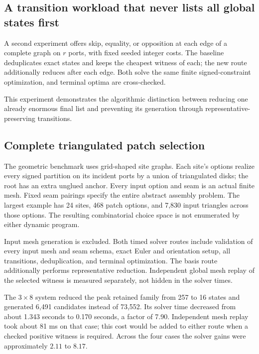 \documentclass[11pt,letterpaper]{article}
\theoremstyle{definition}
\begin{document}
\subsection{A transition workload that never lists all global states first}
A second experiment offers skip, equality, or opposition at each edge of a complete graph on $r$ ports, with fixed seeded integer costs. The baseline deduplicates exact states and keeps the cheapest witness of each; the new route additionally reduces after each edge. Both solve the same finite signed-constraint optimization, and terminal optima are cross-checked.
\begin{table}[ht]
\centering\small
\caption{Complete signed-constraint workloads, medians of three repetitions. This is a finite algebraic benchmark, not an unknot recognizer. Generated-candidate counts include alternatives before exact-state deduplication.}
\label{tab:dynamic}
\end{table}
This experiment demonstrates the algorithmic distinction between reducing one already enormous final list and preventing its generation through representative-preserving transitions.

\subsection{Complete triangulated patch selection}
The geometric benchmark uses grid-shaped site graphs. Each site's options realize every signed partition on its incident ports by a union of triangulated disks; the root has an extra unglued anchor. Every input option and seam is an actual finite mesh. Fixed seam pairings specify the entire abstract assembly problem. The largest example has 24 sites, 468 patch options, and 7,830 input triangles across those options. The resulting combinatorial choice space is not enumerated by either dynamic program.

Input mesh generation is excluded. Both timed solver routes include validation of every input mesh and seam schema, exact Euler and orientation setup, all transitions, deduplication, and terminal optimization. The basis route additionally performs representative reduction. Independent global mesh replay of the selected witness is measured separately, not hidden in the solver times.
\begin{table}[ht]
\centering\small
\caption{Complete finite disk-selection workloads. Times are median milliseconds over three paired repetitions. All returned disk witnesses were reconstructed and checked independently as global meshes.}
\label{tab:patchwork}
\end{table}
The $3\times8$ system reduced the peak retained family from 257 to 16 states and generated 6,491 candidates instead of 73,552. Its solver time decreased from about 1.343 seconds to 0.170 seconds, a factor of 7.90. Independent mesh replay took about 81 ms on that case; this cost would be added to either route when a checked positive witness is required. Across the four cases the solver gains were approximately $2.11$ to $8.17$.
\end{document}
